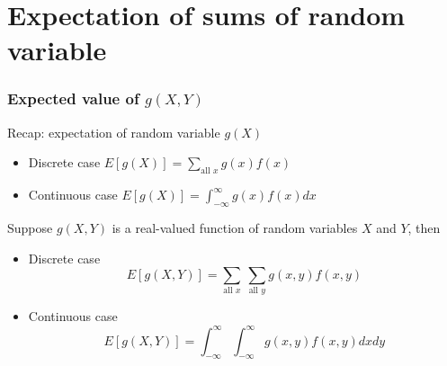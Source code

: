 \documentclass[slidestop,compress,mathserif]{beamer}
\begin{document}
%

%
%








\section{Expectation of sums of random variable}
\begin{frame}
\frametitle{Expected value of $g(X, Y)$}
Recap: expectation of random variable $g(X)$
\begin{itemize}
\item Discrete case $E[g(X)] = \sum_{\text{all } x} g(x) f(x)$
\item Continuous case $E[g(X)] = \int_{-\infty}^{\infty} g(x)f(x) dx$
\end{itemize}


Suppose $g(X,Y)$ is a real-valued function of random variables $X$ and $Y$, then

\begin{itemize}
\item Discrete case
\[E[g(X, Y)] = \sum_{\text{all } x}~\sum_{\text{all } y} g(x,y) f(x, y)\]
\item Continuous case
\[E[g(X, Y)] = \int_{-\infty}^{\infty}\int_{-\infty}^{\infty} g(x,y) f(x, y)dxdy\]
\end{itemize}


\end{frame}

\end{document}

